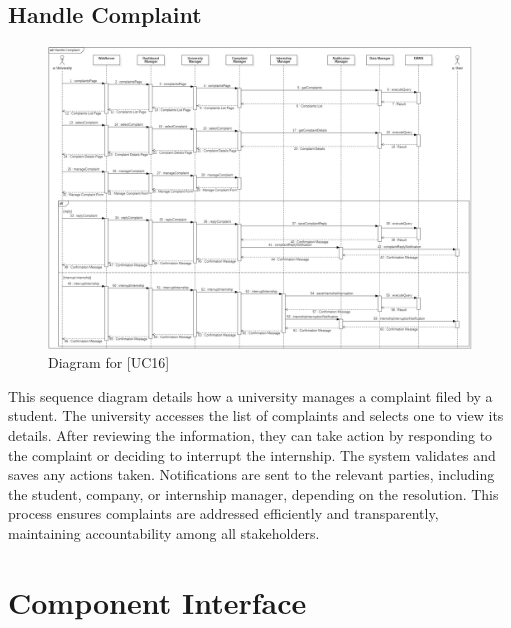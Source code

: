 \subsection{Handle Complaint}
\begin{figure} [H]
    \centering
    \includegraphics[width=1\linewidth]{DD/Images/Runtime Sequence Diagram Images/handle_complaint.png}
    \caption{Diagram for [UC16]}
    \label{fig: Handle Complaint Diagram}
\end{figure}
This sequence diagram details how a university manages a complaint filed by a student. The university accesses the list of complaints and selects one to view its details. After reviewing the information, they can take action by responding to the complaint or deciding to interrupt the internship. The system validates and saves any actions taken. Notifications are sent to the relevant parties, including the student, company, or internship manager, depending on the resolution. This process ensures complaints are addressed efficiently and transparently, maintaining accountability among all stakeholders.

\newpage
\section{Component Interface}

